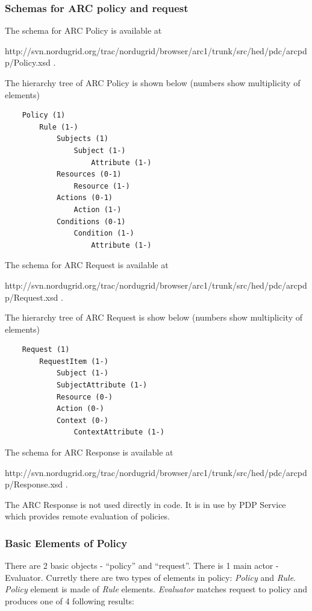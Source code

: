 \documentclass{article}                            %
\begin{document}
\subsubsection{Schemas for ARC policy and request} %
\label{subsubsec:arc_policy_schema}
The schema for ARC Policy is available at

http://svn.nordugrid.org/trac/nordugrid/browser/arc1/trunk/src/hed/pdc/arcpdp/Policy.xsd .

The hierarchy tree of ARC Policy is shown below (numbers show multiplicity of elements)

\begin{verbatim}
    Policy (1)
        Rule (1-)
            Subjects (1)
                Subject (1-)
                    Attribute (1-)
            Resources (0-1)
                Resource (1-)
            Actions (0-1)
                Action (1-)
            Conditions (0-1)
                Condition (1-)
                    Attribute (1-)
\end{verbatim}

The schema for ARC Request is available at

http://svn.nordugrid.org/trac/nordugrid/browser/arc1/trunk/src/hed/pdc/arcpdp/Request.xsd .

The hierarchy tree of ARC Request is show below (numbers show multiplicity of elements)

\begin{verbatim}
    Request (1)
        RequestItem (1-)
            Subject (1-)
	        SubjectAttribute (1-)
            Resource (0-)
            Action (0-)
            Context (0-)
                ContextAttribute (1-)
\end{verbatim}


The schema for ARC Response is available at

http://svn.nordugrid.org/trac/nordugrid/browser/arc1/trunk/src/hed/pdc/arcpdp/Response.xsd .

The ARC Response is not used directly in code. It is in use by PDP Service which provides remote evaluation of policies. 


\subsubsection{Basic Elements of Policy} %
\label{subsubsec:poicy_element}
There are 2 basic objects - ``policy'' and ``request''. There is 1 main actor - Evaluator. Curretly there are two types of elements in policy: \textit{Policy} and \textit{Rule}. \textit{Policy} element is made of \textit{Rule} elements.
\textit{Evaluator} matches request to policy and produces one of 4 following results:
\end{document}
